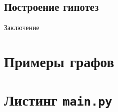 \documentclass[bachelor, och, nir]{SCWorks}
\begin{document}
\subsection{Построение гипотез}

\conclusion
Заключение

% 
% 

\appendix

\section{Примеры графов}

    \section{Листинг \texttt{main.py}}
\end{document}
